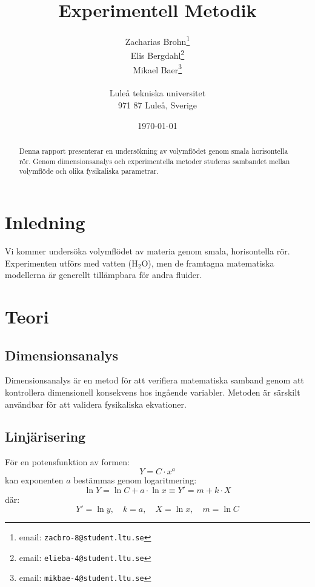 \documentclass[a4paper,12pt]{article}
\begin{document}
%
\title{Experimentell Metodik}
%
\author{Zacharias Brohn\thanks{email: \texttt{zacbro-8@student.ltu.se}}\\  
        Elis Bergdahl\thanks{email: \texttt{elieba-4@student.ltu.se}} \\
        Mikael Baer\thanks{email: \texttt{mikbae-4@student.ltu.se}} \\
        \\
        Luleå tekniska universitet \\ 
        971 87 Luleå, Sverige}
%
\date{\today}
%
\maketitle
%
\begin{abstract}
    Denna rapport presenterar en undersökning av volymflödet genom smala horisontella rör. 
    Genom dimensionsanalys och experimentella metoder studeras sambandet mellan volymflöde 
    och olika fysikaliska parametrar.
\end{abstract}
%
\section{Inledning}
Vi kommer undersöka volymflödet av materia genom smala, horisontella rör. 
Experimenten utförs med vatten ($\mathrm{H_2O}$), men de framtagna matematiska 
modellerna är generellt tillämpbara för andra fluider.
%
\section{Teori}
%
\subsection{Dimensionsanalys}
Dimensionsanalys är en metod för att verifiera matematiska samband genom att 
kontrollera dimensionell konsekvens hos ingående variabler. Metoden är särskilt 
användbar för att validera fysikaliska ekvationer.

\subsection{Linjärisering}
För en potensfunktion av formen:
\begin{equation}
    Y = C \cdot x^a
\end{equation}
kan exponenten $a$ bestämmas genom logaritmering:
\begin{equation}
    \ln Y = \ln C + a \cdot \ln x \equiv Y' = m + k \cdot X
\end{equation}
där:
\begin{equation}
    Y' = \ln y,\quad k = a,\quad X = \ln x,\quad m = \ln C
\end{equation}
%
\end{document}
